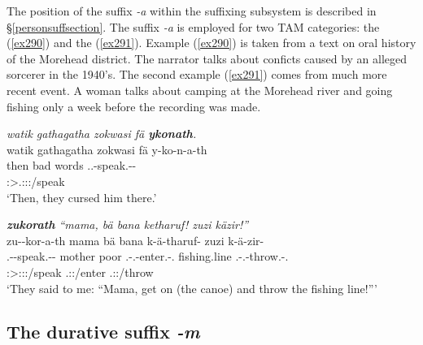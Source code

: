 The position of the  suffix \emph{-a} within the suffixing subsystem is described in \S{}\ref{personsuffsection}. The  suffix \emph{-a} is employed for two TAM categories: the   (\ref{ex290}) and the   (\ref{ex291}). Example (\ref{ex290}) is taken from a text on oral history of the Morehead district. The narrator talks about conficts caused by an alleged sorcerer in the 1940's. The second example (\ref{ex291}) comes from much more recent event. A woman talks about camping at the Morehead river and going fishing only a week before the recording was made.

\begin{exe}
	\ex \emph{watik gathagatha zokwasi fä \textbf{ykonath}.}\\
	\glll watik {gathagatha} zokwasi fä y-ko-n-a-th\\
	then {bad} words \Dist{} \Tsg.\Masc.\Alph-speak.\Ext-\Du-\Stnsg{}\\
	{} {} {} {} \footnotesize{\Stdu:\Sbj>\Tsg.\Masc:\Obj:\Pst:\Ipfv/speak}\\
	\trans `Then, they cursed him there.' 
	\label{ex290}
\end{exe}
\begin{exe}
	\ex \emph{\textbf{zukorath} ``mama, bä bana ketharuf! zuzi käzir!''}\\
	\glll zu-\Zero{}-kor-a-th mama bä bana k-ä-tharuf-\Zero{} zuzi k-ä-zir-\Zero\\
	\Fsg.\Gam-\Du-speak.\Rs-\Pst-\Stnsg{} mother \Ssg{} poor \M.\Bet-\Vc.\Ndu-enter.\Rs-\Ssg.\Imp{} fishing.line \M.\Bet-\Vc.\Ndu-throw.\Rs-\Ssg.\Imp{}\\
	\footnotesize{\Stdu:\Sbj>\Fsg:\Obj:\Pst:\Pfv/speak} {} {} {} \footnotesize{\Ssg.\Sbj:\Imp:\Pfv/enter} {} \footnotesize{\Ssg.\Sbj:\Imp:\Pfv/throw}\\
	\trans `They said to me: ``Mama, get on (the canoe) and throw the fishing line!'''\\ 
	\label{ex291}
\end{exe}

\subsection{The durative suffix \emph{-m}}\label{durativesuffixm}

